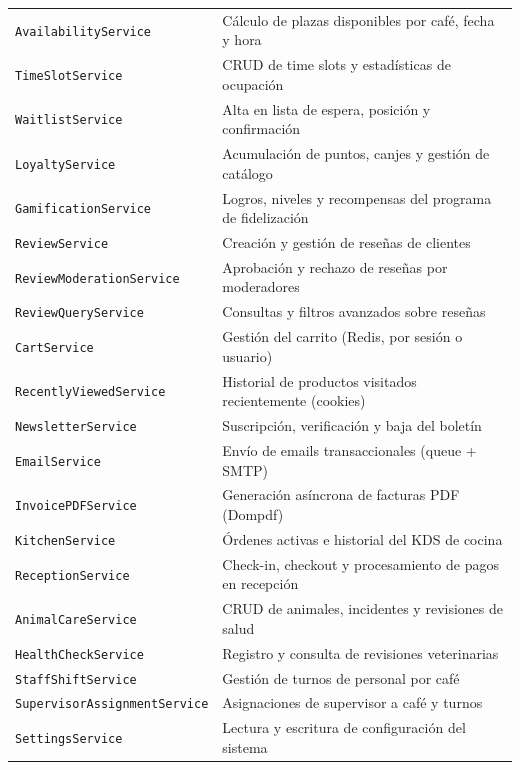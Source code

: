 \documentclass[12pt,a4paper,twoside,openright]{report}
\begin{document}
\begin{longtable}{@{}lp{8cm}@{}}
  \texttt{AvailabilityService}         & Cálculo de plazas disponibles por café, fecha y hora\\
  \texttt{TimeSlotService}             & CRUD de time slots y estadísticas de ocupación\\
  \texttt{WaitlistService}             & Alta en lista de espera, posición y confirmación\\
  \texttt{LoyaltyService}              & Acumulación de puntos, canjes y gestión de catálogo\\
  \texttt{GamificationService}         & Logros, niveles y recompensas del programa de fidelización\\
  \texttt{ReviewService}               & Creación y gestión de reseñas de clientes\\
  \texttt{ReviewModerationService}     & Aprobación y rechazo de reseñas por moderadores\\
  \texttt{ReviewQueryService}          & Consultas y filtros avanzados sobre reseñas\\
  \texttt{CartService}                 & Gestión del carrito (Redis, por sesión o usuario)\\
  \texttt{RecentlyViewedService}       & Historial de productos visitados recientemente (cookies)\\
  \texttt{NewsletterService}           & Suscripción, verificación y baja del boletín\\
  \texttt{EmailService}                & Envío de emails transaccionales (queue + SMTP)\\
  \texttt{InvoicePDFService}           & Generación asíncrona de facturas PDF (Dompdf)\\
  \texttt{KitchenService}              & Órdenes activas e historial del KDS de cocina\\
  \texttt{ReceptionService}            & Check-in, checkout y procesamiento de pagos en recepción\\
  \texttt{AnimalCareService}           & CRUD de animales, incidentes y revisiones de salud\\
  \texttt{HealthCheckService}          & Registro y consulta de revisiones veterinarias\\
  \texttt{StaffShiftService}           & Gestión de turnos de personal por café\\
  \texttt{SupervisorAssignmentService} & Asignaciones de supervisor a café y turnos\\
  \texttt{SettingsService}             & Lectura y escritura de configuración del sistema\\

\end{longtable}
\end{document}
